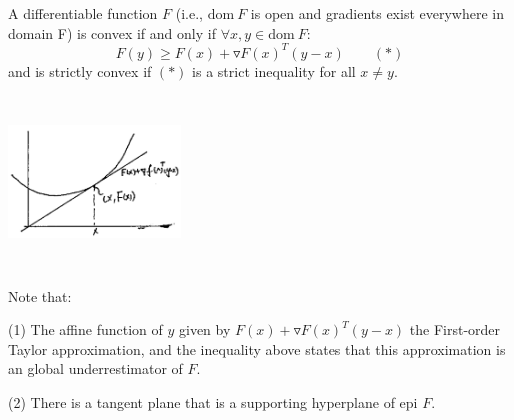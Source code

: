 \begin{theorem}
	A differentiable function $F$ (i.e., $\text{dom}\ F$ is open and gradients exist everywhere in domain F) is convex if and only if $\forall x,y\in \text{dom}\ F$:
	\begin{equation*}
	F(y)\geq F(x) + \triangledown F(x)^T(y-x) \qquad (*)
	\end{equation*}
	and is strictly convex if $(*)$ is a strict inequality for all $x\neq y$.
\end{theorem}
	\begin{marginfigure}
	\centering
	\includegraphics[width=1.8in,height=1.8in]{figures/ch08/figure1106_1.png}
	\end{marginfigure}
	Note that:
	
	(1) The affine function of $y$ given by $F(x) + \triangledown F(x)^T(y-x)$ the First-order Taylor approximation, and the inequality above states that this approximation is an global underrestimator of $F$.
	
	(2) There is a tangent plane that is a supporting hyperplane of epi $F$.

